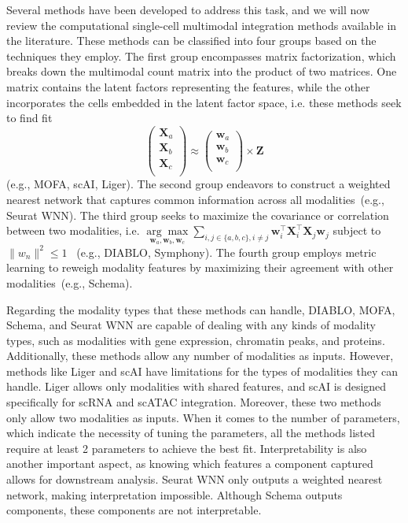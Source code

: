 Several methods have been developed to address this task, and we will now review the computational single-cell multimodal integration methods available in the literature. These methods can be classified into four groups based on the techniques they employ. The first group encompasses matrix factorization, which breaks down the multimodal count matrix into the product of two matrices. One matrix contains the latent factors representing the features, while the other incorporates the cells embedded in the latent factor space, i.e. these methods seek to find fit 
\begin{equation}
\begin{pmatrix}
\mathbf{X}_a\\
\mathbf{X}_b\\
\mathbf{X}_c\\
\end{pmatrix} \approx \begin{pmatrix}
\mathbf{w}_a\\
\mathbf{w}_b\\
\mathbf{w}_c\\
\end{pmatrix} \times \mathbf{Z}
\end{equation}
(e.g., MOFA, scAI, Liger). The second group endeavors to construct a weighted nearest network that captures common information across all modalities~(e.g., Seurat WNN). The third group seeks to maximize the covariance or correlation between two modalities, i.e. $\underset{\mathbf{w}_a, \mathbf{w}_b, \mathbf{w}_c}{\arg\max}\sum_{i,j \in\{a,b,c\}, i\neq j} \mathbf{w}_i^\top \mathbf{X}_i^\top \mathbf{X}_j \mathbf{w}_j$ subject to $\|w_n\|^2 \leq 1$ ~(e.g., DIABLO, Symphony). The fourth group employs metric learning to reweigh modality features by maximizing their agreement with other modalities~(e.g., Schema).


Regarding the modality types that these methods can handle, DIABLO, MOFA, Schema, and Seurat WNN are capable of dealing with any kinds of modality types, such as modalities with gene expression, chromatin peaks, and proteins. Additionally, these methods allow any number of modalities as inputs. However, methods like Liger and scAI have limitations for the types of modalities they can handle. Liger allows only modalities with shared features, and scAI is designed specifically for scRNA and scATAC integration. Moreover, these two methods only allow two modalities as inputs. When it comes to the number of parameters, which indicate the necessity of tuning the parameters, all the methods listed require at least 2 parameters to achieve the best fit. Interpretability is also another important aspect, as knowing which features a component captured allows for downstream analysis. Seurat WNN only outputs a weighted nearest network, making interpretation impossible. Although Schema outputs components, these components are not interpretable.




